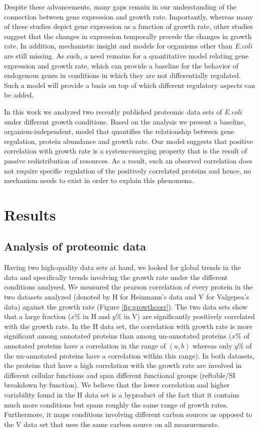 \documentclass[notitlepage]{article}
\begin{document}
Despite these advancements, many gaps remain in our understanding of the connection between gene expression and growth rate.
Importantly, whereas many of these studies depict gene expression as a function of growth rate, other studies suggest that the changes in expression temporally precede the changes in growth rate\parencite{levy2007}.
In addition, mechanistic insight and models for organisms other than \emph{E.coli} are still missing.
As such, a need remains for a quantitative model relating gene expression and growth rate, which can provide a baseline for the behavior of endogenous genes in conditions in which they are not differentially regulated.
Such a model will provide a basis on top of which different regulatory aspects can be added.

In this work we analyzed two recently published proteomic data sets of \emph{E.coli} under different growth conditions.
Based on the analysis we present a baseline, organism-independent, model that quantifies the relationship between gene regulation, protein abundance and growth rate.
Our model suggests that positive correlation with growth rate is a system-emerging property that is the result of passive redistribution of resources.
As a result, such an observed correlation does not require specific regulation of the positively correlated proteins and hence, no mechanism needs to exist in order to explain this phenomena.

\section{Results}
\subsection{Analysis of proteomic data}
Having two high-quality data sets at hand, we looked for global trends in the data and specifically trends involving the growth rate under the different conditions analysed.
We measured the pearson correlation of every protein in the two datasets analyzed (denoted by H for Heinmann's data and V for Valgepea's data) against the growth rate (Figure \ref{fig:growthcorr}).
The two data sets show that a large fraction ($x\% $ in H and $y\% $ in V) are significantly positively correlated with the growth rate.
In the H data set, the correlation with growth rate is more significant among annotated proteins than among un-annotated proteins ($x\% $ of annotated proteins have a correlation in the range of $(a,b)$ whereas only $y\% $ of the un-annotated proteins have a correlation within this range).
In both datasets, the proteins that have a high correlation with the growth rate are involved in different cellular functions and span different functional groups (reftable/SI breakdown by function).
We believe that the lower correlation and higher variability found in the H data set is a byproduct of the fact that it contains much more conditions but spans roughly the same range of growth rates.
Furthermore, it maps conditions involving different carbon sources as opposed to the V data set that uses the same carbon source on all measurements.
\end{document}
